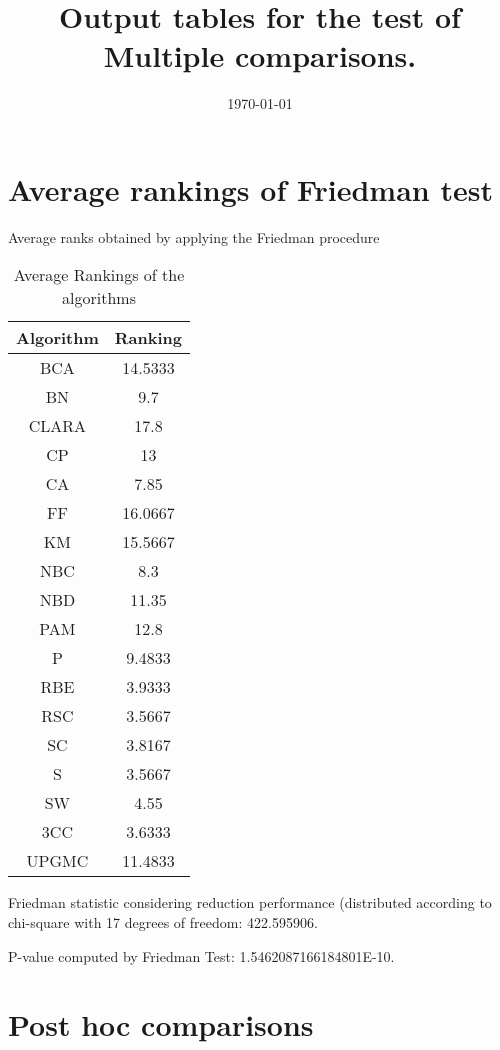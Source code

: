\documentclass[a4paper,10pt]{article}
\title{Output tables for the test of Multiple comparisons.}
\author{}
\date{\today}
\begin{document}
\begin{landscape}
\pagestyle{empty}
\maketitle
\thispagestyle{empty}
\section{Average rankings of Friedman test}



Average ranks obtained by applying the Friedman procedure

\begin{table}[!htp]
\centering
\begin{tabular}{|c|c|}\hline
Algorithm&Ranking\\\hline
BCA & 14.5333\\
BN & 9.7\\
CLARA & 17.8\\
CP & 13\\
CA & 7.85\\
FF & 16.0667\\
KM & 15.5667\\
NBC & 8.3\\
NBD & 11.35\\
PAM & 12.8\\
P & 9.4833\\
RBE & 3.9333\\
RSC & 3.5667\\
SC & 3.8167\\
S & 3.5667\\
SW & 4.55\\
3CC & 3.6333\\
UPGMC & 11.4833\\
\hline
\end{tabular}
\caption{Average Rankings of the algorithms}
\end{table}

Friedman statistic considering reduction performance (distributed according to chi-square with 17 degrees of freedom: 422.595906.

P-value computed by Friedman Test: 1.5462087166184801E-10.\newline



\pagebreak

\section{Post hoc comparisons}


\end{landscape}
\end{document}
